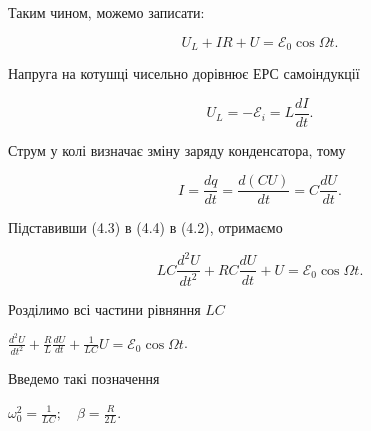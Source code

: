\documentclass[12pt, a4paper]{article}
\begin{document}
    Таким чином, можемо записати:

    \begin{equation}
        U_L + IR + U = \mathcal{E}_0 \cos \Omega t.
        \tag{4.2}
    \end{equation}

    Напруга на котушці чисельно дорівнює ЕРС самоіндукції

    \begin{equation}
        U_L = -\mathcal{E}_i = L \frac{dI}{dt}.
        \tag{4.3}
    \end{equation}

    Струм у колі визначає зміну заряду конденсатора, тому

    \vspace{0.5em}

    \begin{equation}
        I = \frac{dq}{dt} = \frac{d(CU)}{dt} = C \frac{dU}{dt}.
        \tag{4.4}
    \end{equation}

    \vspace{0.5em}

    Підставивши (4.3) в (4.4) в (4.2), отримаємо

    \vspace{0.5em}

    \begin{equation}
        LC \frac{d^2U}{dt^2} + RC \frac{dU}{dt} + U = \mathcal{E}_0 \cos \Omega t.
        \tag{4.5}
    \end{equation}

    \vspace{0.5em}

    Розділимо всі частини рівняння $LC$

    \vspace{0.5em}

    \begin{center}
        $\displaystyle \frac{d^2U}{dt^2} + \frac{R}{L} \frac{dU}{dt} + \frac{1}{LC}U = \mathcal{E}_0 \cos \Omega t$.
    \end{center}

    \vspace{0.5em}

    Введемо такі позначення

    \vspace{0.5em}

    \begin{center}
        $\displaystyle \omega_0^2 = \frac{1}{LC}; \quad \beta = \frac{R}{2L}$.
    \end{center}
\end{document}

